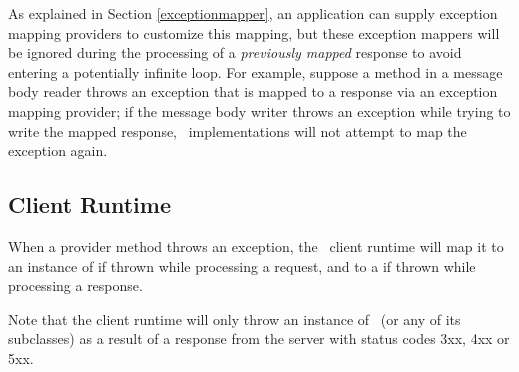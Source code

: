 As explained in Section \ref{exceptionmapper}, an application can supply exception mapping providers to customize this mapping, but these exception mappers will be ignored during the processing of a {\em previously mapped} response to avoid entering a potentially infinite loop. For example, suppose a method in a message body reader throws an exception that is mapped to a response via an exception mapping provider; if the message body writer throws an exception while trying to write the mapped response, \jaxrs\ implementations will not attempt to map the exception again.

\subsection{Client Runtime}
\label{exceptions_providers_client}

When a provider method throws an exception, the \jaxrs\ client runtime will map it to an instance of  if thrown while processing a request, and to a  if thrown while processing a response. 

Note that the client runtime will only throw an instance of \WebApplicationException\ (or any of its subclasses) as a result of a response from the server with status codes 3xx, 4xx or 5xx.

